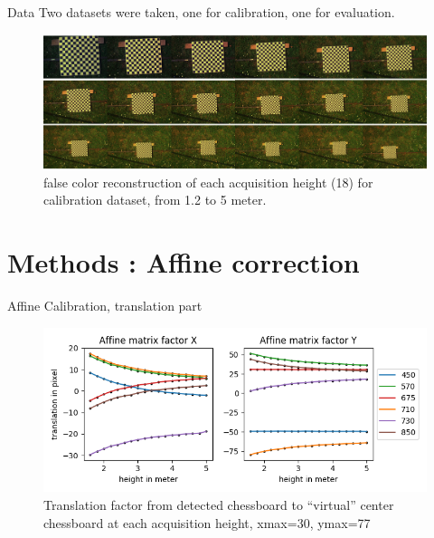 \documentclass{beamer}
\begin{document}
		\begin{frame}{Data}
			Two datasets were taken, one for calibration, one for evaluation.
			\begin{figure}
				\includegraphics[width=\linewidth]{../figures/calibration-height.jpg}
				\caption{false color reconstruction of each acquisition height (18) for calibration dataset, from 1.2 to 5 meter.}
			\end{figure}
		\end{frame}
	
	\section{Methods : Affine correction}
	
		\begin{frame}{Affine Calibration, translation part}
			\begin{figure}
				\includegraphics[width=0.7\linewidth]{../figures/affine-translation-height.png}
				\caption{Translation factor from detected chessboard to ``virtual'' center chessboard at each acquisition height, xmax=30, ymax=77}
			\end{figure}
		\end{frame}
\end{document}
